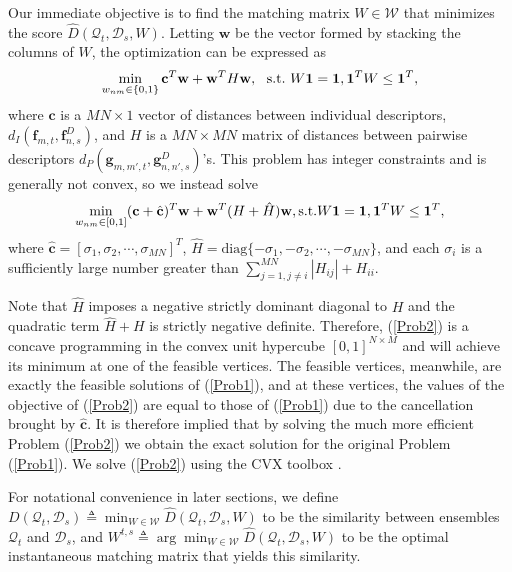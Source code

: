 Our immediate objective is to find the matching matrix $W\in\mathcal{W}$ that minimizes the score $\hat{D}(\mathcal{Q}_{t}, \mathcal{D}_{s}, W)$. Letting $\mathbf{w}$ be the vector formed by stacking the columns of $W$, the optimization can be expressed as
\begin{equation}
\label{Prob1}
\min_{w_{nm}\in\{0,1\}}\mathbf{c}^{T}\mathbf{w}+\mathbf{w}^{T}H\mathbf{w},\ \ \textup{s.t.}\ W\mathbf{1}=\mathbf{1}, \mathbf{1}^{T}W\leq\mathbf{1}^{T},
\end{equation}
where $\mathbf{c}$ is a $MN\times 1$ vector of distances between individual descriptors, $d_{I}(\mathbf{f}_{m,t}, \mathbf{f}^{D}_{n,s})$, and $H$ is a $MN\times MN$ matrix of distances between pairwise descriptors $d_{P}(\mathbf{g}_{m,m',t}, \mathbf{g}^{D}_{n,n',s})$'s. This problem has integer constraints and is generally not convex, so we instead solve
\begin{equation}
\label{Prob2}
\min_{w_{nm}\in[0,1]}(\mathbf{c}+\hat{\mathbf{c}})^{T}\mathbf{w}+\mathbf{w}^{T}(H+\hat{H})\mathbf{w}, \textup{s.t.} W\mathbf{1}=\mathbf{1}, \mathbf{1}^{T}W\leq\mathbf{1}^{T},
\end{equation}
where $\hat{\mathbf{c}}=[\sigma_{1},\sigma_{2},\cdots,\sigma_{MN}]^{T}$, $\hat{H}=\text{diag}\{-\sigma_{1},-\sigma_{2},\cdots,-\sigma_{MN}\}$, and each $\sigma_{i}$ is a sufficiently large number greater than $\sum^{MN}_{j=1,j\neq i}|H_{ij}|+H_{ii}$. 

Note that $\hat{H}$ imposes a negative strictly dominant diagonal to $H$ and the quadratic term $\hat{H}+H$ is strictly negative definite. Therefore, (\ref{Prob2}) is a concave programming in the convex unit hypercube $[0,1]^{N\times M}$ and will achieve its minimum at one of the feasible vertices. The feasible vertices, meanwhile, are exactly the feasible solutions of (\ref{Prob1}), and at these vertices, the values of the objective of (\ref{Prob2}) are equal to those of (\ref{Prob1}) due to the cancellation brought by $\hat{\mathbf{c}}$. It is therefore implied that by solving the much more efficient Problem (\ref{Prob2}) we obtain the exact solution for the original Problem (\ref{Prob1}). We solve (\ref{Prob2}) using the CVX toolbox \cite{cvx}.

For notational convenience in later sections, we define $D(\mathcal{Q}_{t}, \mathcal{D}_{s})\triangleq\min_{W\in\mathcal{W}}\hat{D}(\mathcal{Q}_{t}, \mathcal{D}_{s}, W)$ to be  the similarity between ensembles $\mathcal{Q}_{t}$ and $\mathcal{D}_{s}$, and $W^{t,s}\triangleq\arg\min_{W\in\mathcal{W}}\hat{D}(\mathcal{Q}_{t}, \mathcal{D}_{s}, W)$ to be the optimal instantaneous matching matrix that yields this similarity.

